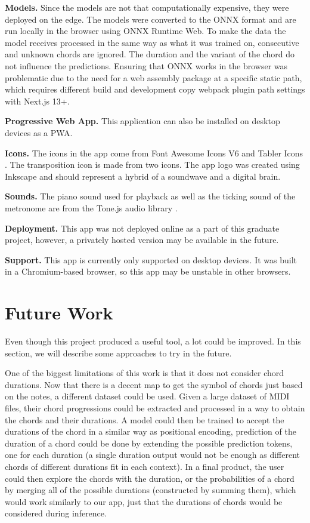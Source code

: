 \documentclass{article}
\begin{document}
\textbf{Models.} Since the models are not that computationally expensive, they were deployed on the edge. The models were converted to the ONNX format and are run locally in the browser using ONNX Runtime Web. To make the data the model receives processed in the same way as what it was trained on, consecutive and unknown chords are ignored. The duration and the variant of the chord do not influence the predictions. Ensuring that ONNX works in the browser was problematic due to the need for a web assembly package at a specific static path, which requires different build and development copy webpack plugin path settings with Next.js 13+.

\textbf{Progressive Web App.} This application can also be installed on desktop devices as a PWA.

\textbf{Icons.} The icons in the app come from Font Awesome Icons V6 \cite{fontawesome6} and Tabler Icons \cite{tablericons}. The transposition icon is made from two icons. The app logo was created using Inkscape \cite{inkscape1.2.2} and should represent a hybrid of a soundwave and a digital brain.

\textbf{Sounds.} The piano sound used for playback as well as the ticking sound of the metronome are from the Tone.js audio library \cite{TonejsAudio}.

\textbf{Deployment.} This app was not deployed online as a part of this graduate project, however, a privately hosted version may be available in the future.

\textbf{Support.} This app is currently only supported on desktop devices. It was built in a Chromium-based browser, so this app may be unstable in other browsers.

\section{Future Work}

Even though this project produced a useful tool, a lot could be improved. In this section, we will describe some approaches to try in the future.

One of the biggest limitations of this work is that it does not consider chord durations. Now that there is a decent map to get the symbol of chords just based on the notes, a different dataset could be used. Given a large dataset of MIDI files, their chord progressions could be extracted and processed in a way to obtain the chords and their durations. A model could then be trained to accept the durations of the chord in a similar way as positional encoding, prediction of the duration of a chord could be done by extending the possible prediction tokens, one for each duration (a single duration output would not be enough as different chords of different durations fit in each context). In a final product, the user could then explore the chords with the duration, or the probabilities of a chord by merging all of the possible durations (constructed by summing them), which would work similarly to our app, just that the durations of chords would be considered during inference.
\end{document}
